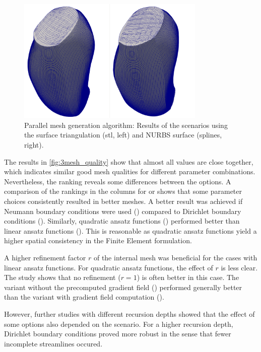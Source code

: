 \begin{figure}%
  \centering%
  \includegraphics[width=0.8\textwidth]{images/parallel_fiber_estimation/stl_splines_results.png}%
  \caption{Parallel mesh generation algorithm: Results of the scenarios using the surface triangulation (stl, left) and NURBS surface (splines, right).}%
  \label{fig:stl_splines_results}%
\end{figure}%

The results in \cref{fig:3mesh_quality} show that almost all values are close together, which indicates similar good mesh qualities for different parameter combinations.
Nevertheless, the ranking reveals some differences between the options. 
A comparison of the rankings in the columns for  or  shows that some parameter choices consistently resulted in better meshes. 
A better result was achieved if Neumann boundary conditions were used () compared to Dirichlet boundary conditions (). 
Similarly, quadratic ansatz functions () performed better than linear ansatz functions (\say{$\ell$}). This is reasonable as quadratic ansatz functions yield a higher spatial consistency in the Finite Element formulation. 

A higher refinement factor $r$ of the internal mesh was beneficial for the cases with linear ansatz functions. For quadratic ansatz functions, the effect of $r$ is less clear. The study shows that no refinement ($r=1$) is often better in this case.
The variant without the precomputed gradient field () performed generally better than the variant with gradient field computation ().

However, further studies with different recursion depths showed that the effect of some options also depended on the scenario. For a higher recursion depth, Dirichlet boundary conditions proved more robust in the sense that fewer incomplete streamlines occured.

